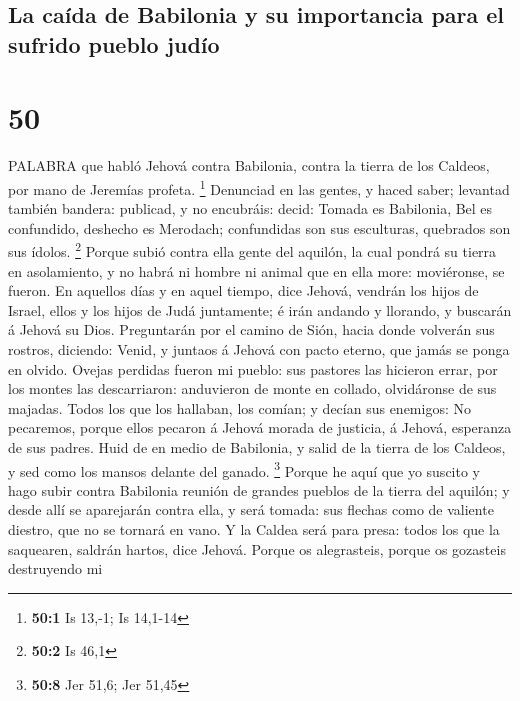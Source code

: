\hypertarget{la-cauxedda-de-babilonia-y-su-importancia-para-el-sufrido-pueblo-juduxedo}{%
\subsection{La caída de Babilonia y su importancia para el sufrido
pueblo
judío}\label{la-cauxedda-de-babilonia-y-su-importancia-para-el-sufrido-pueblo-juduxedo}}

\hypertarget{section-49}{%
\section{50}\label{section-49}}

 PALABRA que habló Jehová contra Babilonia, contra la tierra
de los Caldeos, por mano de Jeremías profeta. \footnote{\textbf{50:1} Is
  13,-1; Is 14,1-14}  Denunciad en las gentes, y haced
saber; levantad también bandera: publicad, y no encubráis: decid: Tomada
es Babilonia, Bel es confundido, deshecho es Merodach; confundidas son
sus esculturas, quebrados son sus ídolos. \footnote{\textbf{50:2} Is
  46,1}  Porque subió contra ella gente del aquilón, la cual
pondrá su tierra en asolamiento, y no habrá ni hombre ni animal que en
ella more: moviéronse, se fueron.  En aquellos días y en
aquel tiempo, dice Jehová, vendrán los hijos de Israel, ellos y los
hijos de Judá juntamente; é irán andando y llorando, y buscarán á Jehová
su Dios.  Preguntarán por el camino de Sión, hacia donde
volverán sus rostros, diciendo: Venid, y juntaos á Jehová con pacto
eterno, que jamás se ponga en olvido.  Ovejas perdidas
fueron mi pueblo: sus pastores las hicieron errar, por los montes las
descarriaron: anduvieron de monte en collado, olvidáronse de sus
majadas.  Todos los que los hallaban, los comían; y decían
sus enemigos: No pecaremos, porque ellos pecaron á Jehová morada de
justicia, á Jehová, esperanza de sus padres.  Huid de en
medio de Babilonia, y salid de la tierra de los Caldeos, y sed como los
mansos delante del ganado. \footnote{\textbf{50:8} Jer 51,6; Jer 51,45}
 Porque he aquí que yo suscito y hago subir contra Babilonia
reunión de grandes pueblos de la tierra del aquilón; y desde allí se
aparejarán contra ella, y será tomada: sus flechas como de valiente
diestro, que no se tornará en vano.  Y la Caldea será para
presa: todos los que la saquearen, saldrán hartos, dice Jehová.
 Porque os alegrasteis, porque os gozasteis destruyendo mi
